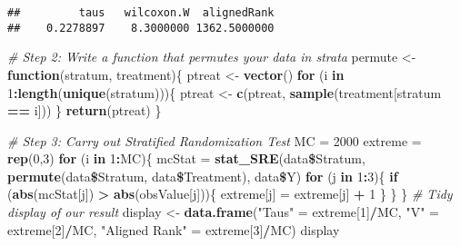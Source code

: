 \documentclass[]{article}
\newenvironment{Shaded}{\begin{snugshade}}{\end{snugshade}}
\newcommand{\KeywordTok}[1]{\textcolor[rgb]{0.13,0.29,0.53}{\textbf{#1}}}
\newcommand{\DecValTok}[1]{\textcolor[rgb]{0.00,0.00,0.81}{#1}}
\newcommand{\StringTok}[1]{\textcolor[rgb]{0.31,0.60,0.02}{#1}}
\newcommand{\CommentTok}[1]{\textcolor[rgb]{0.56,0.35,0.01}{\textit{#1}}}
\newcommand{\ControlFlowTok}[1]{\textcolor[rgb]{0.13,0.29,0.53}{\textbf{#1}}}
\newcommand{\OperatorTok}[1]{\textcolor[rgb]{0.81,0.36,0.00}{\textbf{#1}}}
\newcommand{\NormalTok}[1]{#1}
\begin{document}
\begin{verbatim}
##         taus   wilcoxon.W  alignedRank 
##    0.2278897    8.3000000 1362.5000000
\end{verbatim}

\begin{Shaded}
\begin{Highlighting}[]
\CommentTok{# Step 2: Write a function that permutes your data in strata}
\NormalTok{permute <-}\StringTok{ }\ControlFlowTok{function}\NormalTok{(stratum, treatment)\{}
\NormalTok{  ptreat <-}\StringTok{ }\KeywordTok{vector}\NormalTok{()}
  \ControlFlowTok{for}\NormalTok{ (i }\ControlFlowTok{in} \DecValTok{1}\OperatorTok{:}\KeywordTok{length}\NormalTok{(}\KeywordTok{unique}\NormalTok{(stratum)))\{}
\NormalTok{    ptreat <-}\StringTok{ }\KeywordTok{c}\NormalTok{(ptreat, }\KeywordTok{sample}\NormalTok{(treatment[stratum }\OperatorTok{==}\StringTok{ }\NormalTok{i]))}
\NormalTok{  \}}
  \KeywordTok{return}\NormalTok{(ptreat)}
\NormalTok{\}}
\end{Highlighting}
\end{Shaded}

\begin{Shaded}
\begin{Highlighting}[]
\CommentTok{# Step 3: Carry out Stratified Randomization Test}
\NormalTok{MC =}\StringTok{ }\DecValTok{2000}
\NormalTok{extreme =}\StringTok{ }\KeywordTok{rep}\NormalTok{(}\DecValTok{0}\NormalTok{,}\DecValTok{3}\NormalTok{)}
\ControlFlowTok{for}\NormalTok{ (i }\ControlFlowTok{in} \DecValTok{1}\OperatorTok{:}\NormalTok{MC)\{}
\NormalTok{  mcStat =}\StringTok{ }\KeywordTok{stat_SRE}\NormalTok{(data}\OperatorTok{\$}\NormalTok{Stratum, }\KeywordTok{permute}\NormalTok{(data}\OperatorTok{\$}\NormalTok{Stratum, data}\OperatorTok{\$}\NormalTok{Treatment), data}\OperatorTok{\$}\NormalTok{Y)}
  \ControlFlowTok{for}\NormalTok{ (j }\ControlFlowTok{in} \DecValTok{1}\OperatorTok{:}\DecValTok{3}\NormalTok{)\{}
    \ControlFlowTok{if}\NormalTok{ (}\KeywordTok{abs}\NormalTok{(mcStat[j]) }\OperatorTok{>}\StringTok{ }\KeywordTok{abs}\NormalTok{(obsValue[j]))\{}
\NormalTok{      extreme[j] =}\StringTok{ }\NormalTok{extreme[j] }\OperatorTok{+}\StringTok{ }\DecValTok{1}
\NormalTok{    \}}
\NormalTok{  \}}
\NormalTok{\}}
\CommentTok{# Tidy display of our result}
\NormalTok{display <-}\StringTok{ }\KeywordTok{data.frame}\NormalTok{(}\StringTok{"Taus"}\NormalTok{ =}\StringTok{ }\NormalTok{extreme[}\DecValTok{1}\NormalTok{]}\OperatorTok{/}\NormalTok{MC, }\StringTok{"V"}\NormalTok{ =}\StringTok{ }\NormalTok{extreme[}\DecValTok{2}\NormalTok{]}\OperatorTok{/}\NormalTok{MC, }\StringTok{"Aligned Rank"}\NormalTok{ =}\StringTok{ }\NormalTok{extreme[}\DecValTok{3}\NormalTok{]}\OperatorTok{/}\NormalTok{MC)}
\NormalTok{display}
\end{Highlighting}
\end{Shaded}
\end{document}
